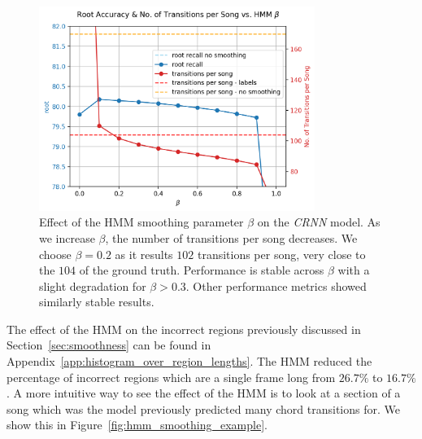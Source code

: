 \begin{figure}[H]
    \centering
    \includegraphics[width=0.8\textwidth]{figures/hmm_beta_vs_root_transitions.png}
    \caption{Effect of the HMM smoothing parameter $\beta$ on the \emph{CRNN} model. As we increase $\beta$, the number of transitions per song decreases. We choose $\beta = 0.2$ as it results $102$ transitions per song, very close to the $104$ of the ground truth. Performance is stable across $\beta$ with a slight degradation for $\beta > 0.3$. Other performance metrics showed similarly stable results. }\label{fig:hmm_beta_search}
\end{figure}

The effect of the HMM on the incorrect regions previously discussed in Section~\ref{sec:smoothness} can be found in Appendix~\ref{app:histogram_over_region_lengths}. The HMM reduced the percentage of incorrect regions which are a single frame long from $26.7\%$ to $16.7\%$. A more intuitive way to see the effect of the HMM is to look at a section of a song which was the model previously predicted many chord transitions for. We show this in Figure~\ref{fig:hmm_smoothing_example}.

